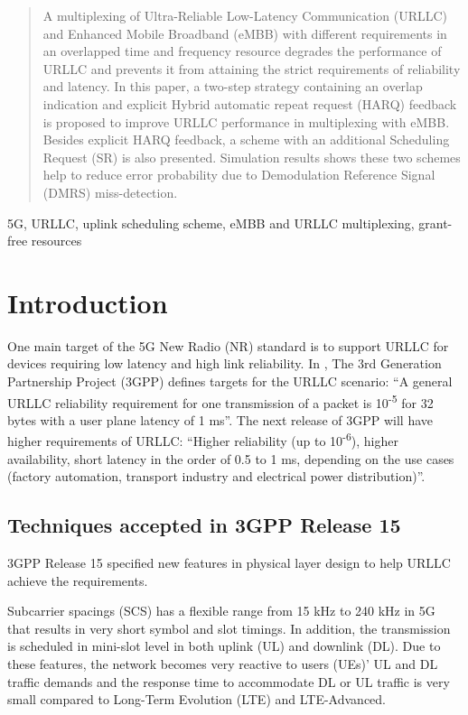 \documentclass[conference]{IEEEtran}
\begin{document}
\begin{abstract}
A multiplexing of Ultra-Reliable Low-Latency Communication (URLLC) and Enhanced Mobile Broadband (eMBB) with different requirements in an overlapped time and frequency resource degrades the performance of URLLC and prevents it from attaining the strict requirements of reliability and latency. In this paper, a two-step strategy containing an overlap indication and explicit Hybrid automatic repeat request (HARQ) feedback is proposed to improve URLLC performance in multiplexing with eMBB. Besides explicit HARQ feedback, a scheme with an additional Scheduling Request (SR) is also presented. Simulation results shows these two schemes help to reduce error probability due to Demodulation Reference Signal (DMRS) miss-detection.

\end{abstract}

\begin{IEEEkeywords}
5G, URLLC, uplink scheduling scheme, eMBB and URLLC multiplexing, grant-free resources
\end{IEEEkeywords}

\section{Introduction} \label{I}
One main target of the 5G New Radio (NR) standard is to support URLLC for devices requiring low latency and high link reliability. In \cite{b6}, The 3rd Generation Partnership Project (3GPP) defines targets for the URLLC scenario: ``A general URLLC reliability requirement for one transmission of a packet is 10\textsuperscript{-5} for 32 bytes with a user plane latency of 1 ms''. The next release of 3GPP will have higher requirements of URLLC: ``Higher reliability (up to 10\textsuperscript{-6}), higher availability, short latency in the order of 0.5 to 1 ms, depending on the use cases (factory automation, transport industry and electrical power distribution)''\cite{b8}.

\subsection{Techniques accepted in 3GPP Release 15}\label{IAA}
3GPP Release 15 specified new features in physical layer design to help URLLC achieve the requirements.

Subcarrier spacings (SCS) has a flexible range from 15 kHz to 240 kHz in 5G that results in very short symbol and slot timings\cite{ad2}. In addition, the transmission is scheduled in  mini-slot level in both uplink (UL) and downlink (DL)\cite{ad3}. Due to these features, the network becomes very reactive to users (UEs)' UL and DL traffic demands and the response time to accommodate DL or UL traffic is very small compared to Long-Term Evolution (LTE) and LTE-Advanced.
\end{document}
